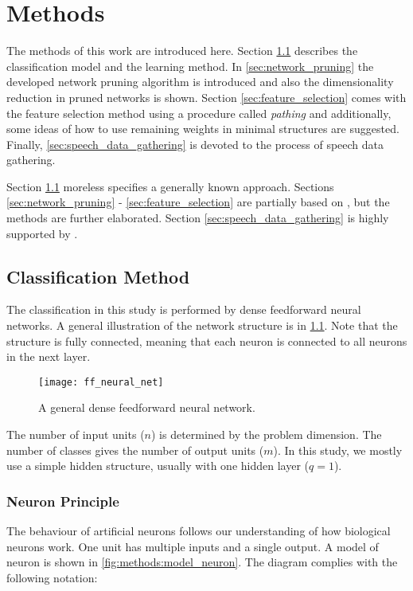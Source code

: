 \chapter{Methods} \label{chap:methods}
The methods of this work are introduced here. Section \ref{sec:classification_method} describes the classification model and the learning method. In \cref{sec:network_pruning} the developed network pruning algorithm is introduced and also the dimensionality reduction in pruned networks is shown. Section \ref{sec:feature_selection} comes with the feature selection method using a procedure called \textit{pathing} and additionally, some ideas of how to use remaining weights in minimal structures are suggested. Finally, \cref{sec:speech_data_gathering} is devoted to the process of speech data gathering.

Section \ref{sec:classification_method} moreless specifies a generally known approach. Sections \ref{sec:network_pruning} - \ref{sec:feature_selection} are partially based on \citep{bulin_2016}, but the methods are further elaborated. Section \ref{sec:speech_data_gathering} is highly supported by \citep{smidl_pc}.

\section{Classification Method} \label{sec:classification_method}
The classification in this study is performed by dense feedforward neural networks. A general illustration of the network structure is in \cref{fig:methods:ff_neural_net}. Note that the structure is fully connected, meaning that each neuron is connected to all neurons in the next layer.

\begin{figure}[H]
\centering
\texttt{[image: ff\_neural\_net]}
\caption{A general dense feedforward neural network.}
\label{fig:methods:ff_neural_net}
\end{figure}

The number of input units ($ n $) is determined by the problem dimension. The number of classes gives the number of output units ($ m $). In this study, we mostly use a simple hidden structure, usually with one hidden layer ($ q = 1 $).

\subsection*{Neuron Principle}
The behaviour of artificial neurons follows our understanding of how biological neurons work. One unit has multiple inputs and a single output. A model of neuron is shown in \cref{fig:methods:model_neuron}. The diagram complies with the following notation:


